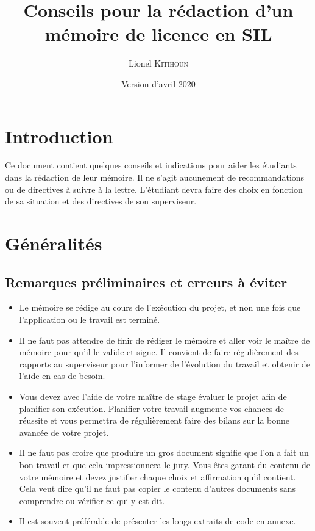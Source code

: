 \documentclass[12pt]{article}
\title{Conseils pour la rédaction d'un mémoire de licence en SIL}
\author{Lionel \textsc{Kitihoun}}
\date{Version d'avril 2020}
\begin{document}
\maketitle

\section*{Introduction}
Ce document contient quelques conseils et indications pour aider les étudiants dans la rédaction de leur mémoire. Il ne s'agit aucunement de recommandations ou de directives à suivre à la lettre. L'étudiant devra faire des choix en fonction de sa situation et des directives de son superviseur.

\section{Généralités}

\subsection{Remarques préliminaires et erreurs à éviter}
\begin{itemize}
  \item Le mémoire se rédige au cours de  l'exécution du projet, et non une fois que l'application ou le travail est terminé.
  \item Il ne faut pas attendre de finir de rédiger le mémoire et aller voir le maître de mémoire pour qu'il le valide et signe. Il convient de faire régulièrement des rapports au superviseur pour l'informer de l'évolution du travail et obtenir de l'aide en cas de besoin.
  \item Vous devez avec l'aide de votre maître de stage évaluer le projet afin de planifier son exécution. Planifier votre travail augmente vos chances de réussite et vous permettra de régulièrement faire des bilans sur la bonne avancée de votre projet.
  \item Il ne faut pas croire que produire un gros document signifie que l'on a fait un bon travail et que cela impressionnera le jury. Vous êtes garant du contenu de votre mémoire et devez justifier chaque choix et affirmation qu'il contient. Cela veut dire qu'il ne faut pas copier le contenu d'autres documents sans comprendre ou vérifier ce qui y est dit.
  \item Il est souvent préférable de présenter les longs extraits de code en annexe.
\end{itemize}
\end{document}
